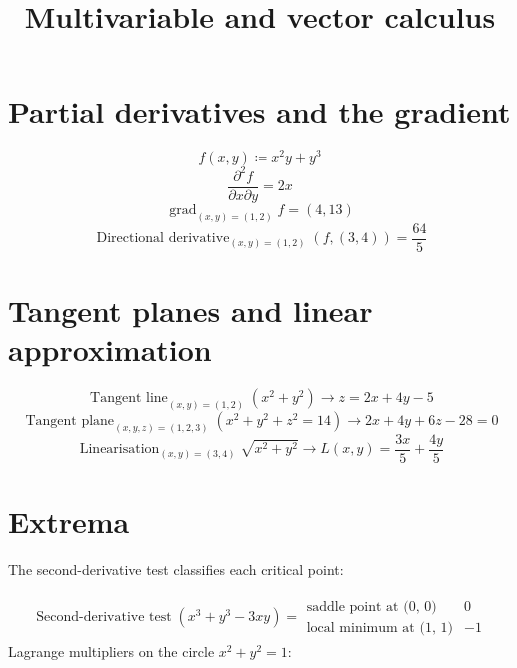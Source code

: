 \documentclass[11pt,a4paper]{article}
\title{Multivariable and vector calculus}
\date{}
\theoremstyle{plain}
\theoremstyle{definition}
\theoremstyle{remark}
\begin{document}
\maketitle
\section*{Partial derivatives and the gradient}

\begin{equation*}
  f(x, y) \coloneqq  x^2 y + y^3
\end{equation*}
\begin{equation*}
  \frac{\partial^2 f}{\partial x \partial y} = 2 x
\end{equation*}
\begin{equation*}
  \operatorname{grad}_{(x,y)=(1,2)} f = \left(4, 13\right)
\end{equation*}
\begin{equation*}
  \operatorname{Directional\ derivative}_{(x,y)=(1,2)}(f, (3, 4)) = \frac{64}{5}
\end{equation*}
\section*{Tangent planes and linear approximation}

\begin{equation*}
  \operatorname{Tangent\ line}_{(x,y)=(1,2)} (x^2 + y^2) \to z = 2 x + 4 y - 5
\end{equation*}
\begin{equation*}
  \operatorname{Tangent\ plane}_{(x,y,z)=(1,2,3)} (x^2 + y^2 + z^2 = 14) \to 2 x + 4 y + 6 z - 28 = 0
\end{equation*}
\begin{equation*}
  \operatorname{Linearisation}_{(x,y)=(3,4)} \sqrt{x^2 + y^2} \to L\left(x, y\right) = \frac{3 x}{5} + \frac{4 y}{5}
\end{equation*}
\section*{Extrema}

The second-derivative test classifies each critical point:

\begin{align*}
  \operatorname{Second-derivative\ test} (x^3 + y^3 - 3xy) = \begin{array}{ll} \text{saddle point at (0, 0)} & 0 \\ \text{local minimum at (1, 1)} & -1 \end{array}
\end{align*}
Lagrange multipliers on the circle $x^2 + y^2 = 1$:
\end{document}
